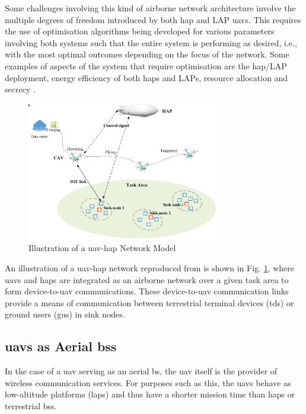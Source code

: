Some challenges involving this kind of airborne network architecture involve the multiple degrees of freedom introduced by both \acrshort{hap} and LAP \acrshort{uav}s. This requires the use of optimisation algorithms being developed for various parameters involving both systems such that the entire system is performing as desired, i.e., with the most optimal outcomes depending on the focus of the network. 
Some examples of aspects of the system that require optimisation are the \acrshort{hap}/LAP deployment, energy efficiency of both \acrshort{hap}s and LAPs, resource allocation and secrecy \cite{zhang_one_2025}.
\begin{figure}[ht]
    \centering
    \includegraphics[width=0.75\textwidth]{figures/uav_hap_network_energy_efficient.png}
    \caption{Illustration of a \acrshort{uav}-\acrshort{hap} Network Model}
    \label{fig:energy_efficient_uav_hap_zhao}
\end{figure}
An illustration of a \acrshort{uav}-\acrshort{hap} network reproduced from \cite{zhao_energy_2023} is shown in Fig. \ref{fig:energy_efficient_uav_hap_zhao}, where \acrshort{uav}s and \acrshort{hap}s are integrated as an airborne network over a given task area to form device-to-\acrshort{uav} communications. These device-to-\acrshort{uav} communication links provide a means of communication between terrestrial terminal devices (\acrshort{td}s) or ground users (\acrshort{gu}s) in sink nodes. 

\subsection{\texorpdfstring{\acrshort{uav}s as Aerial \acrshort{bs}s}{UAVs as Aerial BSs}}
In the case of a \acrshort{uav} serving as an aerial \acrshort{bs}, the \acrshort{uav} itself is the provider of wireless communication services. For purposes such as this, the \acrshort{uav}s behave as low-altitude platforms (\acrshort{lap}s) and thus have a shorter mission time than \acrshort{hap}s or terrestrial \acrshort{bs}s. 

